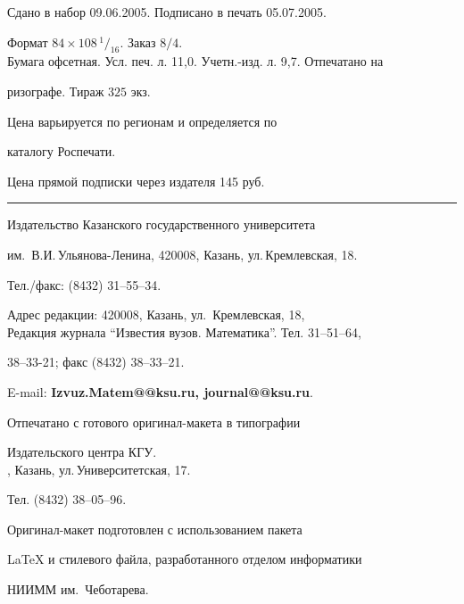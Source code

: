 \noindent Сдано в набор 09.06.2005. Подписано в печать 05.07.2005.


Формат $84\times 108 \,^1/_{16}.$ Заказ $8/4$.\\


Бумага офсетная. Усл. печ. л. 11,0. Учетн.-изд. л. 9,7. Отпечатано на 


ризографе. Тираж $325$ экз. 





\noindent Цена варьируется по регионам и определяется по 


каталогу Роспечати. 





\noindent Цена прямой подписки через издателя 145 руб. 


\bigskip


\hrule


\bigskip


\noindent Издательство Казанского государственного университета


им.~В.И.\,Ульянова-Ленина, 420008, Казань, ул.\,Кремлевская, 18.


Тел./факс: (8432) 31--55--34.\\


\smallskip





\noindent Адрес редакции: 420008, Казань, ул.~Кремлевская, 18,\\  


Редакция журнала  ``Известия вузов. Математика''. Тел. 31--51--64,


38--33-21; факс (8432) 38--33--21.





\noindent E-mail: {\bf Izvuz.Matem@@ksu.ru, journal@@ksu.ru}. \par


\bigskip 


\noindent Отпечатано с готового оригинал-макета в типографии


Издательского центра КГУ. \\





, Казань, ул.\,Университетская, 17.


Тел. (8432) 38--05--96. \par


\bigskip


\noindent Оригинал-макет подготовлен с использованием пакета


\AmS\LaTeX{} и стилевого файла, разработанного отделом информатики


НИИММ им.~Чеботарева.








